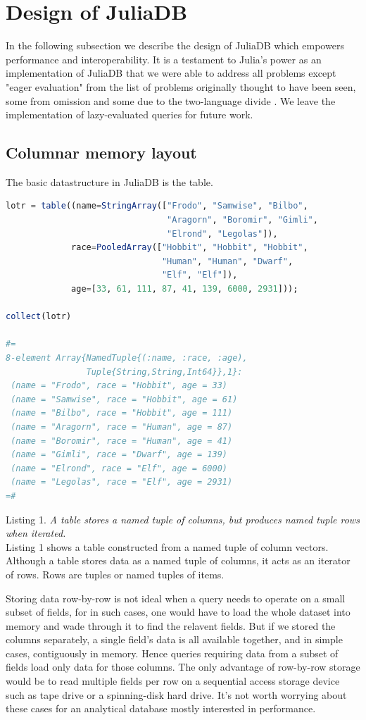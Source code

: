 \documentclass{juliacon}
\begin{document}
\section{Design of JuliaDB}

In the following subsection we describe the design of JuliaDB which empowers performance and interoperability. It is a testament to Julia's power as an implementation of JuliaDB that we were able to address all problems except "eager evaluation" from the list of problems originally thought to have been seen, some from omission and some due to the two-language divide \cite{wes2017}. We leave the implementation of lazy-evaluated queries for future work.

\subsection{Columnar memory layout}
The basic datastructure in JuliaDB is the table.

\begin{lstlisting}[language=Julia]
lotr = table((name=StringArray(["Frodo", "Samwise", "Bilbo",
                                "Aragorn", "Boromir", "Gimli",
                                "Elrond", "Legolas"]),
             race=PooledArray(["Hobbit", "Hobbit", "Hobbit",
                               "Human", "Human", "Dwarf",
                               "Elf", "Elf"]),
             age=[33, 61, 111, 87, 41, 139, 6000, 2931]));

collect(lotr)

#=
8-element Array{NamedTuple{(:name, :race, :age),
                Tuple{String,String,Int64}},1}:
 (name = "Frodo", race = "Hobbit", age = 33)  
 (name = "Samwise", race = "Hobbit", age = 61)
 (name = "Bilbo", race = "Hobbit", age = 111) 
 (name = "Aragorn", race = "Human", age = 87) 
 (name = "Boromir", race = "Human", age = 41) 
 (name = "Gimli", race = "Dwarf", age = 139)  
 (name = "Elrond", race = "Elf", age = 6000)  
 (name = "Legolas", race = "Elf", age = 2931) 
=#
\end{lstlisting}
Listing 1. \emph{A table stores a named tuple of columns, but produces named tuple rows when iterated.}\\

Listing 1 shows a table constructed from a named tuple of column vectors. Although a table stores data as a named tuple of columns, it acts as an iterator of rows. Rows are tuples or named tuples of items.

Storing data row-by-row is not ideal when a query needs to operate on a small subset of fields, for in such cases, one would have to load the whole dataset into memory and wade through it to find the relavent fields. But if we stored the columns separately, a single field's data is all available together, and in simple cases, contiguously in memory. Hence queries requiring data from a subset of fields load only data for those columns. The only advantage of row-by-row storage would be to read multiple fields per row on a sequential access storage device such as tape drive or a spinning-disk hard drive. It's not worth worrying about these cases for an analytical database mostly interested in performance.
\end{document}
